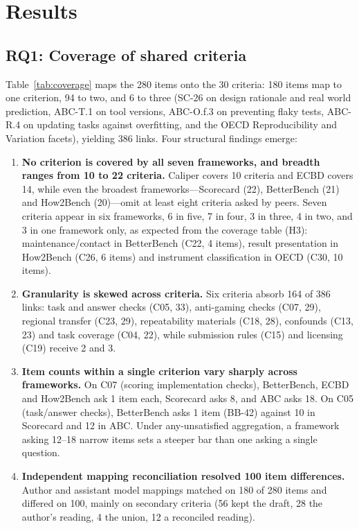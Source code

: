 \documentclass[10pt,conference]{IEEEtran}
\begin{document}
\section{Results}
\subsection{RQ1: Coverage of shared criteria}
\label{sec:rq1}
Table~\ref{tab:coverage} maps the 280 items onto the 30 criteria: 180 items map to one criterion, 94 to two, and 6 to three (SC-26 on design rationale and real world prediction, ABC-T.1 on tool versions, ABC-O.f.3 on preventing flaky tests, ABC-R.4 on updating tasks against overfitting, and the OECD Reproducibility and Variation facets), yielding 386 links. Four structural findings emerge:
\begin{enumerate}
\item \textbf{No criterion is covered by all seven frameworks, and breadth ranges from 10 to 22 criteria.} Caliper covers 10 criteria and ECBD covers 14, while even the broadest frameworks—Scorecard (22), BetterBench (21) and How2Bench (20)—omit at least eight criteria asked by peers. Seven criteria appear in six frameworks, 6 in five, 7 in four, 3 in three, 4 in two, and 3 in one framework only, as expected from the coverage table (H3): maintenance/contact in BetterBench (C22, 4 items), result presentation in How2Bench (C26, 6 items) and instrument classification in OECD (C30, 10 items).
\item \textbf{Granularity is skewed across criteria.} Six criteria absorb 164 of 386 links: task and answer checks (C05, 33), anti-gaming checks (C07, 29), regional transfer (C23, 29), repeatability materials (C18, 28), confounds (C13, 23) and task coverage (C04, 22), while submission rules (C15) and licensing (C19) receive 2 and 3.
\item \textbf{Item counts within a single criterion vary sharply across frameworks.} On C07 (scoring implementation checks), BetterBench, ECBD and How2Bench ask 1 item each, Scorecard asks 8, and ABC asks 18. On C05 (task/answer checks), BetterBench asks 1 item (BB-42) against 10 in Scorecard and 12 in ABC. Under any-unsatisfied aggregation, a framework asking 12--18 narrow items sets a steeper bar than one asking a single question.
\item \textbf{Independent mapping reconciliation resolved 100 item differences.} Author and assistant model mappings matched on 180 of 280 items and differed on 100, mainly on secondary criteria (56 kept the draft, 28 the author's reading, 4 the union, 12 a reconciled reading).
\end{enumerate}
\end{document}
